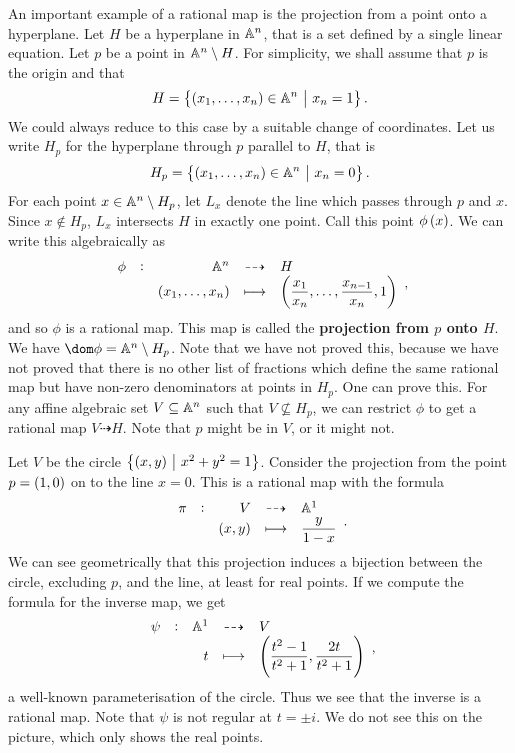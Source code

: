 \begin{example*}
An important example of a rational map is the projection from a point onto a hyperplane. Let $ H $ be a hyperplane in $ \AA^n $, that is a set defined by a single linear equation. Let $ p $ be a point in $ \AA^n \setminus H $. For simplicity, we shall assume that $ p $ is the origin and that
$$ H = \cbr{\br{x_1, \dots, x_n} \in \AA^n \st x_n = 1}. $$
We could always reduce to this case by a suitable change of coordinates. Let us write $ H_p $ for the hyperplane through $ p $ parallel to $ H $, that is
$$ H_p = \cbr{\br{x_1, \dots, x_n} \in \AA^n \st x_n = 0}. $$
For each point $ x \in \AA^n \setminus H_p $, let $ L_x $ denote the line which passes through $ p $ and $ x $. Since $ x \notin H_p $, $ L_x $ intersects $ H $ in exactly one point. Call this point $ \phi\br{x} $. We can write this algebraically as
$$ \rational[\phi]{\AA^n}{H}{\br{x_1, \dots, x_n}}{\br{\dfrac{x_1}{x_n}, \dots, \dfrac{x_{n - 1}}{x_n}, 1}}, $$
and so $ \phi $ is a rational map. This map is called the \textbf{projection from $ p $ onto $ H $}. We have $ \dom \phi = \AA^n \setminus H_p $. Note that we have not proved this, because we have not proved that there is no other list of fractions which define the same rational map but have non-zero denominators at points in $ H_p $. One can prove this. For any affine algebraic set $ V \subseteq \AA^n $ such that $ V \not\subseteq H_p $, we can restrict $ \phi $ to get a rational map $ V \dashrightarrow H $. Note that $ p $ might be in $ V $, or it might not.
\end{example*}

\pagebreak

\begin{example*}
Let $ V $ be the circle $ \cbr{\br{x, y} \st x^2 + y^2 = 1} $. Consider the projection from the point $ p = \br{1, 0} $ on to the line $ x = 0 $. This is a rational map with the formula
$$ \rational[\pi]{V}{\AA^1}{\br{x, y}}{\dfrac{y}{1 - x}}. $$
We can see geometrically that this projection induces a bijection between the circle, excluding $ p $, and the line, at least for real points. If we compute the formula for the inverse map, we get
$$ \rational[\psi]{\AA^1}{V}{t}{\br{\dfrac{t^2 - 1}{t^2 + 1}, \dfrac{2t}{t^2 + 1}}}, $$
a well-known parameterisation of the circle. Thus we see that the inverse is a rational map. Note that $ \psi $ is not regular at $ t = \pm i $. We do not see this on the picture, which only shows the real points.
\end{example*}

